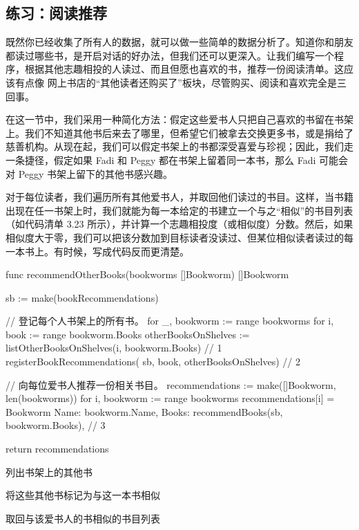 \subsection{练习：阅读推荐}

既然你已经收集了所有人的数据，就可以做一些简单的数据分析了。知道你和朋友都读过哪些书，是开启对话的好办法，但我们还可以更深入。让我们编写一个程序，根据其他志趣相投的人读过、而且但愿也喜欢的书，推荐一份阅读清单。这应该有点像
网上书店的“其他读者还购买了”板块，尽管购买、阅读和喜欢完全是三回事。

在这一节中，我们采用一种简化方法：假定这些爱书人只把自己喜欢的书留在书架上。我们不知道其他书后来去了哪里，但希望它们被拿去交换更多书，或是捐给了慈善机构。从现在起，我们可以假定书架上的书都深受喜爱与珍视；因此，我们走一条捷径，假定如果 Fadi 和 Peggy 都在书架上留着同一本书，那么 Fadi 可能会对 Peggy 书架上留下的其他书感兴趣。

对于每位读者，我们遍历所有其他爱书人，并取回他们读过的书目。这样，当书籍出现在任一书架上时，我们就能为每一本给定的书建立一个与之“相似”的书目列表（如代码清单 3.23 所示），并计算一个志趣相投度（或相似度）分数。然后，如果相似度大于零，我们可以把该分数加到目标读者没读过、但某位相似读者读过的每一本书上。有时候，写成代码反而更清楚。

\begin{gocode}[title={代码清单 3.23 \texttt{recommendations.go}：一种可能的实现}]
func recommendOtherBooks(bookworms []Bookworm) []Bookworm {
    sb := make(bookRecommendations)

    // 登记每个人书架上的所有书。
    for _, bookworm := range bookworms {
        for i, book := range bookworm.Books {
            otherBooksOnShelves :=
                listOtherBooksOnShelves(i, bookworm.Books) // 1
            registerBookRecommendations(
                sb, book, otherBooksOnShelves) // 2
        }
    }

    // 向每位爱书人推荐一份相关书目。
    recommendations := make([]Bookworm, len(bookworms))
    for i, bookworm := range bookworms {
        recommendations[i] = Bookworm{
            Name: bookworm.Name,
            Books: recommendBooks(sb, bookworm.Books), // 3
        }
    }

    return recommendations
}
\end{gocode}

\begin{codeannotations}
\item 列出书架上的其他书
\item 将这些其他书标记为与这一本书相似
\item 取回与该爱书人的书相似的书目列表
\end{codeannotations}

